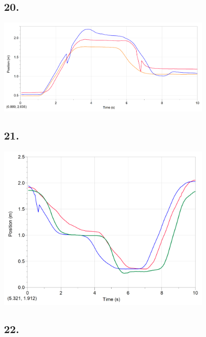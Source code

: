     \subsection*{20.}

    \begin{mdframed}
        \centering\includegraphics[width=0.8\textwidth]{image28.png}
    \end{mdframed}
    
    \subsection*{21.}

    \begin{mdframed}
        \centering\includegraphics[width=0.8\textwidth]{image27.png}
    \end{mdframed}

    \pagebreak

    \subsection*{22.}

